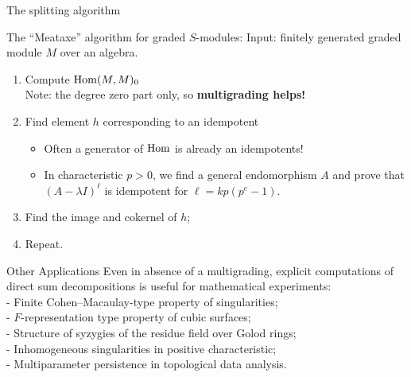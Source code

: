 \documentclass[beamer]{paper}
\begin{document}
\begin{frame}{The splitting algorithm}
  \begin{alertblock}{The ``Meataxe'' algorithm for graded $S$-modules:}
    Input: finitely generated graded module $M$ over an algebra.
    \pause
    \begin{enumerate}
    \item Compute $\operatorname{Hom}(M, M)_0$ \\ \pause
      Note: the degree zero part only, so \textbf{\color{rossgreen}multigrading helps!} \pause
    \item Find element $h$ corresponding to an idempotent \\ \pause
      \begin{itemize}
      \item Often a generator of $\operatorname{Hom}$ is already an idempotents! \pause
      \item In characteristic $p > 0$, we find a general endomorphism $A$
        and prove that $(A-\lambda I)^\ell$ is idempotent for $\ell = kp(p^e-1)$. \pause
      \end{itemize}
    \item Find the image and cokernel of $h$;
    \item Repeat.
    \end{enumerate}
  \end{alertblock}

\end{frame}


\begin{frame}{Other Applications}
  Even in absence of a multigrading, explicit computations of direct
  sum decompositions is useful for mathematical experiments: \\[1em]
  \; - Finite Cohen--Macaulay-type property of singularities; \\
  \; - $F$-representation type property of cubic surfaces; \\
  \; - Structure of syzygies of the residue field over Golod rings; \\
  \; - Inhomogeneous singularities in positive characteristic; \\
  \; - Multiparameter persistence in topological data analysis. \\

\end{frame}
\end{document}

